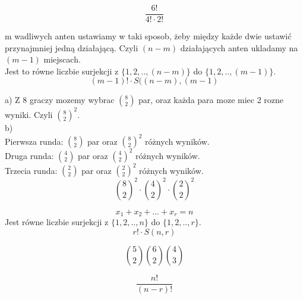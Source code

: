 \documentclass[fleqn]{article}
\begin{document}
\medskip

\medskip
\[\frac{6!}{4! \cdot 2!}\]
\medskip

\medskip

m wadliwych anten ustawiamy w taki sposob, żeby między każde dwie ustawić przynajmniej jedną działającą. Czyli $(n - m)$ działających anten ukladamy na $(m - 1)$ miejscach. \\
Jest to równe liczbie surjekcji z $\big\{1, 2, .., (n-m) \big\}$ do $\big\{1, 2, .., (m-1) \big\}$. \\
\[(m-1)! \cdot S((n-m), (m-1)\]

\medskip

\medskip

a)
Z 8 graczy mozemy wybrac ${8 \choose 2}$ par, oraz każda para moze miec 2 rozne wyniki. Czyli ${ 8\choose 2}^2$.\\
b) \\
Pierwsza runda: ${8 \choose 2}$ par oraz ${ 8\choose 2}^2$ różnych wyników.\\
Druga runda: ${4 \choose 2}$ par oraz ${ 4\choose 2}^2$ różnych wyników. \\
Trzecia runda: ${2 \choose 2}$ par oraz ${ 2\choose 2}^2$ różnych wyników. \\
\[{ 8\choose 2}^2 \cdot { 4\choose 2}^2 \cdot { 2\choose 2}^2\]

\medskip

\medskip
\[x_1 + x_2 + ... + x_r = n \]
Jest równe liczbie surjekcji z $\big\{1, 2, .., n \big\}$ do $\big\{1, 2, .., r \big\}$. \\
\[r! \cdot S(n, r)\]
\medskip

\medskip
\[{5\choose 2} {6\choose 2} {4\choose 3}\]

\medskip
\[\frac{n!}{(n - r)!}\]
\medskip
\end{document}
